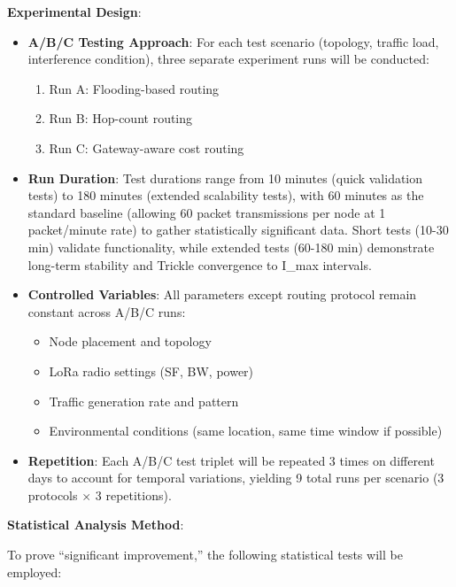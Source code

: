 \textbf{Experimental Design}:

\begin{itemize}
\item \textbf{A/B/C Testing Approach}: For each test scenario (topology, traffic load, interference condition), three separate experiment runs will be conducted:
\begin{enumerate}
\item Run A: Flooding-based routing
\item Run B: Hop-count routing
\item Run C: Gateway-aware cost routing
\end{enumerate}

\item \textbf{Run Duration}: Test durations range from 10 minutes (quick validation tests) to 180 minutes (extended scalability tests), with 60 minutes as the standard baseline (allowing 60 packet transmissions per node at 1 packet/minute rate) to gather statistically significant data. Short tests (10-30 min) validate functionality, while extended tests (60-180 min) demonstrate long-term stability and Trickle convergence to I\_max intervals.

\item \textbf{Controlled Variables}: All parameters except routing protocol remain constant across A/B/C runs:
\begin{itemize}
\item Node placement and topology
\item LoRa radio settings (SF, BW, power)
\item Traffic generation rate and pattern
\item Environmental conditions (same location, same time window if possible)
\end{itemize}

\item \textbf{Repetition}: Each A/B/C test triplet will be repeated 3 times on different days to account for temporal variations, yielding 9 total runs per scenario (3 protocols $\times$ 3 repetitions).
\end{itemize}

\textbf{Statistical Analysis Method}:

To prove ``significant improvement,'' the following statistical tests will be employed:

